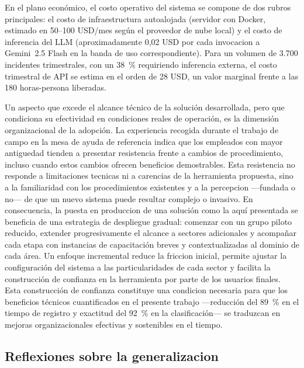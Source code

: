 En el plano económico, el costo operativo del sistema se compone de dos rubros principales: el costo de infraestructura autoalojada (servidor con Docker, estimado en 50--100 USD/mes según el proveedor de nube local) y el costo de inferencia del LLM (aproximadamente 0,02 USD por cada invocacion a Gemini~2.5 Flash en la banda de uso correspondiente). Para un volumen de 3.700 incidentes trimestrales, con un 38~\% requiriendo inferencia externa, el costo trimestral de API se estima en el orden de 28 USD, un valor marginal frente a las 180 horas-persona liberadas.

Un aspecto que excede el alcance técnico de la solución desarrollada, pero que condiciona su efectividad en condiciones reales de operación, es la dimensión organizacional de la adopción. La experiencia recogida durante el trabajo de campo en la mesa de ayuda de referencia indica que los empleados con mayor antiguedad tienden a presentar resistencia frente a cambios de procedimiento, incluso cuando estos cambios ofrecen beneficios demostrables. Esta resistencia no responde a limitaciones tecnicas ni a carencias de la herramienta propuesta, sino a la familiaridad con los procedimientos existentes y a la percepcion ---fundada o no--- de que un nuevo sistema puede resultar complejo o invasivo. En consecuencia, la puesta en produccion de una solución como la aquí presentada se beneficia de una estrategia de despliegue gradual: comenzar con un grupo piloto reducido, extender progresivamente el alcance a sectores adicionales y acompañar cada etapa con instancias de capacitación breves y contextualizadas al dominio de cada área. Un enfoque incremental reduce la friccion inicial, permite ajustar la configuración del sistema a las particularidades de cada sector y facilita la construcción de confianza en la herramienta por parte de los usuarios finales. Esta construcción de confianza constituye una condicion necesaria para que los beneficios técnicos cuantificados en el presente trabajo ---reducción del 89~\% en el tiempo de registro y exactitud del 92~\% en la clasificación--- se traduzcan en mejoras organizacionales efectivas y sostenibles en el tiempo.

\subsection{Reflexiones sobre la generalizacion}

